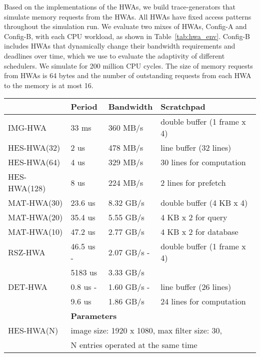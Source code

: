 \documentclass[10pt,letterpaper]{article}
\newcommand{\TMP}[1]{#1}
\begin{document}
Based on the implementations of the HWAs, we build trace-generators that
simulate memory requests from the HWAs. All HWAs have fixed access patterns
throughout the simulation run. We evaluate two mixes of HWAs, Config-A and
Config-B, with each CPU workload, as shown in Table~\ref{tab:hwa_env}. 
\TMP{Config-B
includes HWAs that dynamically change their bandwidth requirements and deadlines over time,
which we use to evaluate the adaptivity of different schedulers. }
We simulate for
200 million CPU cycles.
The size of memory requests from HWAs is 64 bytes and the
number of outstanding requests from each HWA to the memory is at most 16.



\begin{table}[t!]
\vspace{-2mm}
\footnotesize
\centering
\setlength{\tabcolsep}{.3em}
  \begin{tabular}{|l|l|l|l|}
    \hline
    & \textbf{Period} & \textbf{Bandwidth} & \textbf{Scratchpad} \\
    \hline
    IMG-HWA & 33 ms & 360 MB/s & double buffer (1 frame x 4) \\
    \hline
    HES-HWA(32) & 2 us & 478 MB/s & line buffer (32 lines)\\
    \cline{1-3}
    HES-HWA(64) & 4 us & 329 MB/s & 30 lines for computation\\
    \cline{1-3}
    HES-HWA(128) & 8 us & 224 MB/s & 2 lines for prefetch\\
    \hline
    MAT-HWA(30) & 23.6 us & 8.32 GB/s & double buffer (4 KB x 4)\\
    \cline{1-3}
    MAT-HWA(20) & 35.4 us & 5.55 GB/s & 4 KB x 2 for query\\
    \cline{1-3}
    MAT-HWA(10) & 47.2 us & 2.77 GB/s & 4 KB x 2 for database\\
    \hline
    RSZ-HWA & 46.5 us - & 2.07 GB/s - & double buffer (1 frame x 4) \\
    & 5183 us & 3.33 GB/s & \\
    \hline
    DET-HWA & 0.8 us - & 1.60 GB/s - & line buffer (26 lines) \\
    & 9.6 us & 1.86 GB/s & 24 lines for computation \\
    \hline
    \hline
    & \multicolumn{3}{l|}{\textbf{Parameters}} \\
\hline
    HES-HWA(N) & \multicolumn{3}{l|}{ image size: 1920 x 1080, max filter size:
    30,} \\
    ~\cite{mra} & \multicolumn{3}{l|}{N entries operated at the same time}\\

\end{tabular}
\end{table}
\end{document}
